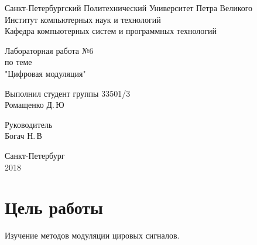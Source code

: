 \documentclass[10pt,a4paper,oneside]{article}
\begin{document}
\begin{titlepage}
	\begin{center}
		Санкт-Петербургский Политехнический Университет     Петра Великого \\
		
		Институт компьютерных наук и технологий \\
		
		Кафедра компьютерных систем и программных технологий
	\end{center}
	
	\vfill
	
	\begin{center}
		Лабораторная работа №6\\
		по теме\\
		"Цифровая модуляция"\\
	\end{center}
	
	\vfill
	
	\newlength{\ML}
	\hfill\begin{minipage}{0.4\textwidth}
		Выполнил студент группы 33501/3\\
		\underline{\hspace{\ML}} Ромащенко Д.\,Ю\\
	\end{minipage}%
	
	\bigskip
	
	\hfill\begin{minipage}{0.4\textwidth}
		Руководитель\\
		\underline{\hspace{\ML}} Богач Н.\,В\\
	\end{minipage}%
	
	\vfill
	
	\begin{center}
		Санкт-Петербург\\
		2018 
	\end{center}
	
\end{titlepage}


\section{Цель работы}
Изучение методов модуляции цировых сигналов.
\end{document}
